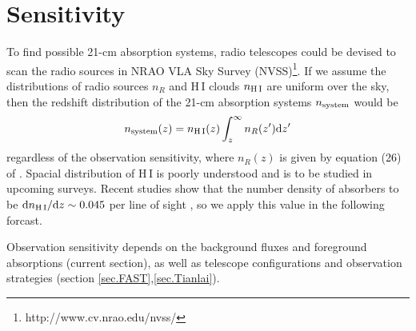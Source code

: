 \documentclass[]{raa}
\newcommand{\diff}{{\rm d}}
\newcommand{\HI}{{H{\small\,I}}}
\begin{document}
\section{Sensitivity}\label{sec.sensitivity}
To find possible 21-cm absorption systems, radio telescopes
could be devised to scan the radio sources in
NRAO VLA Sky Survey (NVSS)\footnote{http://www.cv.nrao.edu/nvss/}.
If we assume the distributions of radio sources $n_R$ and
{\HI} clouds $n_{\rm \HI}$ are uniform over the sky, then the redshift
distribution of the 21-cm absorption systems $n_{\rm system}$ would be
\begin{equation}\label{eq.n_system}
    n_{\rm system}(z)=n_{\rm \HI}(z)\int_z^\infty n_R(z')\diff z'
\end{equation}
regardless of the observation sensitivity,
where $n_R(z)$ is given by equation (26) of \cite{2010A&ARv..18....1D}.
Spacial distribution of {\HI} is poorly understood and is to be
studied in upcoming surveys.
Recent studies show that the number density of
absorbers to be $\diff n_{\rm \HI}/\diff z\sim 0.045$
per line of sight
\citep{2005ARA&A..43..861W,2007ASSP....3..501Z}, so we apply this value
in the following forcast.

Observation sensitivity depends on the background fluxes and foreground
absorptions (current section), as well as telescope configurations and
observation strategies (section \ref{sec.FAST},\ref{sec.Tianlai}).
\end{document}
